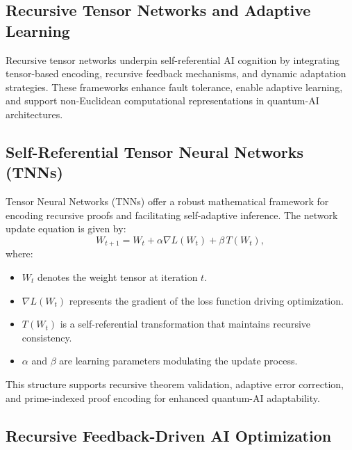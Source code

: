 \documentclass{article}
\theoremstyle{plain}
\begin{document}
\begin{itemize}
\begin{itemize}
\section{Recursive Tensor Networks and Adaptive Learning}

Recursive tensor networks underpin self-referential AI cognition by integrating tensor-based encoding, recursive feedback mechanisms, and dynamic adaptation strategies. These frameworks enhance fault tolerance, enable adaptive learning, and support non-Euclidean computational representations in quantum-AI architectures.

\subsection{Self-Referential Tensor Neural Networks (TNNs)}

Tensor Neural Networks (TNNs) offer a robust mathematical framework for encoding recursive proofs and facilitating self-adaptive inference. The network update equation is given by:
\begin{equation}
W_{t+1} = W_t + \alpha \nabla L(W_t) + \beta\, T(W_t),
\end{equation}
where:
\begin{itemize}
    \item \(W_t\) denotes the weight tensor at iteration \(t\).
    \item \(\nabla L(W_t)\) represents the gradient of the loss function driving optimization.
    \item \(T(W_t)\) is a self-referential transformation that maintains recursive consistency.
    \item \(\alpha\) and \(\beta\) are learning parameters modulating the update process.
\end{itemize}
This structure supports recursive theorem validation, adaptive error correction, and prime-indexed proof encoding for enhanced quantum-AI adaptability.

\subsection{Recursive Feedback-Driven AI Optimization}


\end{itemize}
\end{itemize}
\end{document}
